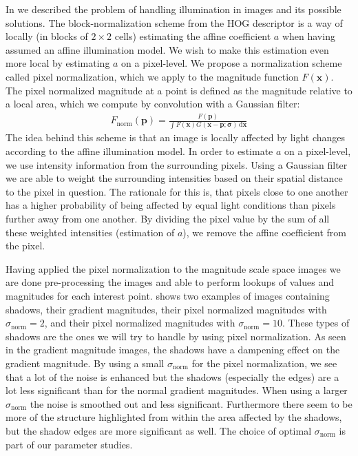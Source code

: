 \documentclass[thesis.tex]{subfiles}
\def\x{\mathbf{x}}
\def\p{\mathbf{p}}
\begin{document}
In  we described the problem of handling illumination in images and its possible solutions. The block-normalization scheme from the HOG descriptor \cite{dalal2005histograms} is a way of locally (in blocks of $2\times2$ cells) estimating the affine coefficient $a$ when having assumed an affine illumination model. We wish to make this estimation even more local by estimating $a$ on a pixel-level. We propose a normalization scheme called pixel normalization, which we apply to the magnitude function $F(\x)$.
The pixel normalized magnitude at a point is defined as the magnitude relative to a local area, which we compute by convolution with a Gaussian filter:
%
\begin{align}
F_\text{norm}(\p) = \frac{F(\p)}{\int F(\x) G(\x - \p; \boldsymbol{\sigma}) \,\text{d} \x}
\end{align}
%
The idea behind this scheme is that an image is locally affected by light changes according to the affine illumination model. In order to estimate $a$ on a pixel-level, we use intensity information from the surrounding pixels. Using a Gaussian filter we are able to weight the surrounding intensities based on their spatial distance to the pixel in question. The rationale for this is, that pixels close to one another has a higher probability of being affected by equal light conditions than pixels further away from one another. By dividing the pixel value by the sum of all these weighted intensities (estimation of $a$), we remove the affine coefficient from the pixel.

Having applied the pixel normalization to the magnitude scale space images we are done pre-processing the images and able to perform lookups of values and magnitudes for each interest point.
 shows two examples of images containing shadows, their gradient magnitudes, their pixel normalized magnitudes with $\sigma_\text{norm} = 2$, and their pixel normalized magnitudes with $\sigma_\text{norm} = 10$. These types of shadows are the ones we will try to handle by using pixel normalization. As seen in the gradient magnitude images, the shadows have a dampening effect on the gradient magnitude. By using a small $\sigma_\text{norm}$ for the pixel normalization, we see that a lot of the noise is enhanced but the shadows (especially the edges) are a lot less significant than for the normal gradient magnitudes. When using a larger $\sigma_\text{norm}$ the noise is smoothed out and less significant. Furthermore there seem to be more of the structure highlighted from within the area affected by the shadows, but the shadow edges are more significant as well. The choice of optimal $\sigma_\text{norm}$ is part of our parameter studies.
\end{document}
